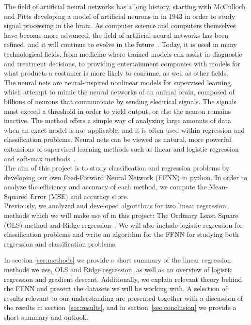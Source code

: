 \documentclass[english,notitlepage,reprint,nofootinbib]{revtex4-2}  %
\begin{document}
The field of artificial neural networks has a long history, starting with McCulloch and Pitts developing a model of artificial neurons in in 1943 in order to study signal processing in the brain. As computer science and computers themselves have become more advanced, the field of artificial neural networks has been refined, and it will continue to evolve in the future~\cite{lecture_notes}. Today, it is used in many technological fields, from medicine where trained models can assist in diagnostic and treatment decisions, to providing entertainment companies with models for what products a costumer is more likely to consume, as well as other fields. 
\vspace{3mm}
\\
The neural nets are neural-inspired nonlinear models for supervised learning, which attempt to mimic the neural networks of an animal brain, composed of billions of neurons that communicate by sending electrical signals. The signals must exceed a threshold in order to yield output, or else the neuron remains inactive. 
The method offers a simple way of analyzing large amounts of data when an exact model is not applicable, and it is often used within regression and classification problems. Neural nets can be viewed as natural, more powerful extensions of supervised learning methods such as linear and logistic regression and soft-max methods~\cite{lecture_notes}. 
\vspace{3mm}
\\
The aim of this project is to study classification and regression problems by developing our own Feed-Forward Neural Network (FFNN) in python. 
In order to analyze the efficiency and accuracy of each method, we compute the Mean-Squared Error (MSE) and accuracy score. 
\vspace{3mm}
\\
Previously, we analyzed and developed algorithms for two linear regression methods which we will make use of in this project: The Ordinary Least Square (OLS) method and Ridge regression~\cite{proj1}. We will also include logistic regression for classification problems and write an algorithm for the FFNN for studying both regression and classification problems. 

In section \ref{sec:methods} we provide a short summary of the linear regression methods we use, OLS and Ridge regression, as well as an overview of logistic regression and gradient descent. Additionally, we explain relevant theory behind the FFNN and present the datasets we will be working with. 
A selection of results relevant to our understanding are presented together with a discussion of the results in section~\ref{sec:results}, 
and in section~\ref{sec:conclusion} we provide a short summary and outlook. 
\end{document}
